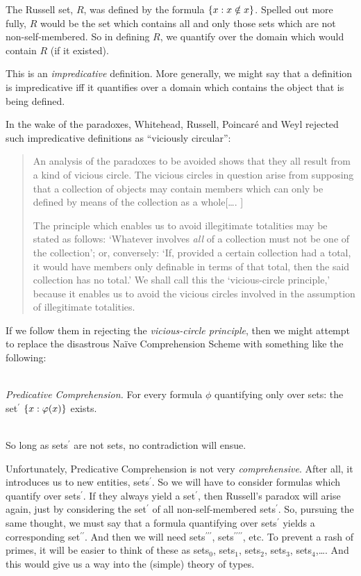 \documentclass[../../../include/open-logic-section]{subfiles}
\begin{document}


The Russell set, $R$, was defined by the formula $\{ x : x \notin
x \}$. Spelled out more fully, $R$ would be the set which contains all
and only those sets which are not non-self-membered. So in defining
$R$, we quantify over the domain which would contain $R$ (if it
existed).

This is an \emph{impredicative} definition. More generally, we might
say that a definition is impredicative iff it quantifies over a domain
which contains the object that is being defined.  
	
In the wake of the paradoxes, Whitehead, Russell, Poincar\'{e} and
Weyl rejected such impredicative definitions as ``viciously
circular'':
\begin{quote}
	An analysis of the paradoxes to be avoided shows that they all
	result from a kind of vicious circle. The vicious circles in
	question arise from supposing that a collection of objects may
	contain members which can only be defined by means of the
	collection as a whole[\ldots. \textparagraph]

	The principle which enables us to avoid illegitimate totalities
	may be stated as follows: `Whatever involves \emph{all} of a
	collection must not be one of the collection'; or, conversely:
	`If, provided a certain collection had a total, it would have
	members only definable in terms of that total, then the said
	collection has no total.' We shall call this the `vicious-circle
	principle,' because it enables us to avoid the vicious circles
	involved in the assumption of illegitimate totalities.
	\citep[p.~37]{WhiteheadRussell1910}
\end{quote}
If we follow them in rejecting the \emph{vicious-circle principle},
then we might attempt to replace the disastrous Na\"{i}ve
Comprehension Scheme with something like the following:

	\
	\\\emph{Predicative Comprehension.} For every formula $\phi$ quantifying only over sets: the set$^\prime$ $\{ x : \varphi(x) \}$ exists.
	
\
\\So long as sets$^{\prime}$ are not sets, no contradiction will ensue.  

Unfortunately, Predicative Comprehension is not very
\emph{comprehensive}. After all, it introduces us to new entities,
sets$^\prime$. So we will have to consider formulas which quantify
over sets$^\prime$. If they always yield a set$^\prime$, then
Russell's paradox will arise again, just by considering the
set$^\prime$ of all non-self-membered sets$^\prime$. So, pursuing the
same thought, we must say that a formula quantifying over
sets$^\prime$ yields a corresponding set$^{\prime\prime}$. And then we
will need sets$^{\prime\prime\prime}$,
sets$^{\prime\prime\prime\prime}$, etc. To prevent a rash of primes,
it will be easier to think of these as sets$_0$, sets$_1$, sets$_2$,
sets$_3$, sets$_4$,\ldots. And this would give us a way into the
(simple) theory of types. 
\end{document}
